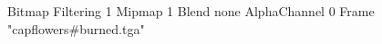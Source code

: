 {Bitmap
	{Filtering 1}
	{Mipmap 1}
	{Blend none}
	{AlphaChannel 0}
	{Frame "capflowers#burned.tga"}
}
